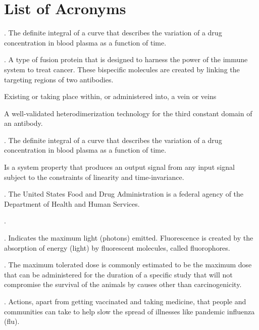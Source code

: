 \chapter*{List of Acronyms}

\begin{acronym}
	.
	The definite integral of a curve that describes the variation of a drug concentration in blood plasma as a function of time.
	
	.
	A type of fusion protein that is designed to harness the power of the immune system to treat cancer. These bispecific molecules are created by linking the targeting regions of two antibodies.
	
	Existing or taking place within, or administered into, a vein or veins
	
	A well-validated heterodimerization technology for the third constant domain of an antibody.
	
	.
	The definite integral of a curve that describes the variation of a drug concentration in blood plasma as a function of time.
	
	Is a system property that produces an output signal from any input signal subject to the constraints of linearity and time-invariance.
	
	.
	The United States Food and Drug Administration is a federal agency of the Department of Health and Human Services.
	
	.
	
	.
	Indicates the maximum light (photons) emitted. Fluorescence is created by the absorption of energy (light) by fluorescent molecules, called fluorophores.
	
	.
	The maximum tolerated dose is commonly estimated to be the maximum dose that can be administered for the duration of a specific study that will not compromise the survival of the animals by causes other than carcinogenicity.

	.
	Actions, apart from getting vaccinated and taking medicine, that people and communities can take to help slow the spread of illnesses like pandemic influenza (flu).
	

\end{acronym}
